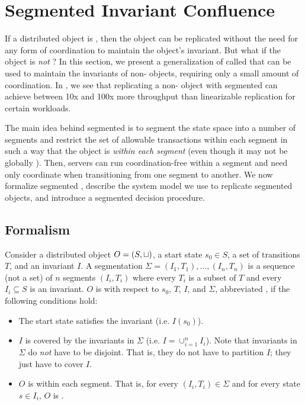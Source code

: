\section{Segmented Invariant Confluence}
\newcommand{\IsIclosed}{\textsc{IsIclosed}}

If a distributed object is \invariantconfluent{}, then the object can be
replicated without the need for any form of coordination to maintain the
object's invariant. But what if the object is \emph{not} \invariantconfluent{}?
In this section, we present a generalization of \invariantconfluence{} called
 that can be used to maintain the
invariants of non-\invariantconfluent{} objects, requiring only a small amount
of coordination. In , we see that replicating a
non-\invariantconfluent{} object with segmented \invariantconfluence{} can
achieve between 10x and 100x more throughput than linearizable replication for
certain workloads.

The main idea behind segmented \invariantconfluence{} is to segment the state
space into a number of segments and restrict the set of allowable transactions
within each segment in such a way that the object is \invariantconfluent{}
\emph{within each segment} (even though it may not be globally
\invariantconfluent{}). Then, servers can run coordination-free within a
segment and need only coordinate when transitioning from one segment to
another. We now formalize segmented \invariantconfluence{}, describe the system
model we use to replicate segmented \invariantconfluent{} objects, and
introduce a segmented \invariantconfluence{} decision procedure.

\subsection{Formalism}
Consider a distributed object $O = (S, \sqcup)$, a start state $s_0 \in S$, a
set of transitions $T$, and an invariant $I$. A segmentation $\Sigma = (I_1,
T_1), \ldots, (I_n, T_n)$ is a sequence (not a set) of $n$ segments $(I_i,
T_i)$ where every $T_i$ is a subset of $T$ and every $I_i \subseteq S$ is an
invariant. $O$ is  with respect to
$s_0$, $T$, $I$, and $\Sigma$, abbreviated , if the
following conditions hold:
\begin{itemize}
  \item
    The start state satisfies the invariant (i.e. $I(s_0)$).

  \item
    $I$ is covered by the invariants in $\Sigma$ (i.e. $I = \cup_{i=1}^n I_i$).
    Note that invariants in $\Sigma$ do \emph{not} have to be disjoint. That
    is, they do not have to partition $I$; they just have to cover $I$.

  \item
    $O$ is \invariantconfluent{} within each segment. That is, for every $(I_i,
    T_i) \in \Sigma$ and for every state $s \in I_i$, $O$ is
    .
\end{itemize}


